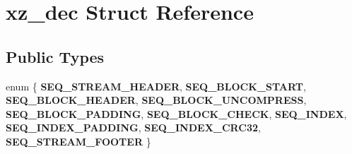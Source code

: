 \hypertarget{structxz__dec}{}\section{xz\+\_\+dec Struct Reference}
\label{structxz__dec}
\subsection*{Public Types}
\begin{DoxyCompactItemize}
\item 
\mbox{\label{structxz__dec_abd024a9a56a8d425cb5aff5887c22096}} 
enum \{ \newline
{\bfseries S\+E\+Q\+\_\+\+S\+T\+R\+E\+A\+M\+\_\+\+H\+E\+A\+D\+ER}, 
{\bfseries S\+E\+Q\+\_\+\+B\+L\+O\+C\+K\+\_\+\+S\+T\+A\+RT}, 
{\bfseries S\+E\+Q\+\_\+\+B\+L\+O\+C\+K\+\_\+\+H\+E\+A\+D\+ER}, 
{\bfseries S\+E\+Q\+\_\+\+B\+L\+O\+C\+K\+\_\+\+U\+N\+C\+O\+M\+P\+R\+E\+SS}, 
\newline
{\bfseries S\+E\+Q\+\_\+\+B\+L\+O\+C\+K\+\_\+\+P\+A\+D\+D\+I\+NG}, 
{\bfseries S\+E\+Q\+\_\+\+B\+L\+O\+C\+K\+\_\+\+C\+H\+E\+CK}, 
{\bfseries S\+E\+Q\+\_\+\+I\+N\+D\+EX}, 
{\bfseries S\+E\+Q\+\_\+\+I\+N\+D\+E\+X\+\_\+\+P\+A\+D\+D\+I\+NG}, 
\newline
{\bfseries S\+E\+Q\+\_\+\+I\+N\+D\+E\+X\+\_\+\+C\+R\+C32}, 
{\bfseries S\+E\+Q\+\_\+\+S\+T\+R\+E\+A\+M\+\_\+\+F\+O\+O\+T\+ER}
 \}
\end{DoxyCompactItemize}
